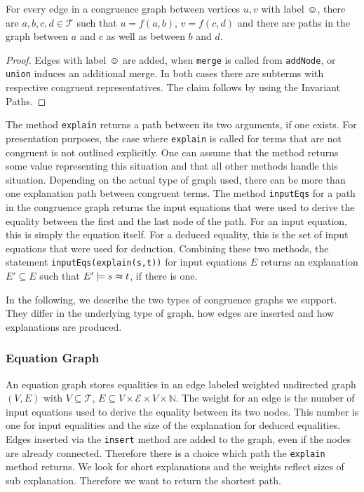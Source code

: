 \begin{invariant}

For every edge in a congruence graph between vertices $u,v$ with label $\smiley$, 
there are $a,b,c,d \in \mathcal{T}$ such that $u = f(a,b)$, $v = f(c,d)$ and
there are paths in the graph between $a$ and $c$ as well as between $b$ and $d$.

\end{invariant}

\begin{proof}

Edges with label $\smiley$ are added, when \texttt{merge} is called from \texttt{addNode}, or \texttt{union} induces an additional merge.
In both cases there are subterms with respective congruent representatives.
The claim follows by using the Invariant Paths.

\end{proof}

The method \texttt{explain} returns a path between its two arguments, if one exists.
For presentation purposes, the case where \texttt{explain} is called for terms that are not congruent is not outlined explicitly.
One can assume that the method returns some value representing this situation and that all other methods handle this situation.
Depending on the actual type of graph used, there can be more than one explanation path between congruent terms.
The method \texttt{inputEqs} for a path in the congruence graph returns the input equations that were used to derive the equality between the first and the last node of the path.
For an input equation, this is simply the equation itself.
For a deduced equality, this is the set of input equations that were used for deduction.
Combining these two methods, the statement \texttt{inputEqs(explain(s,t))} for input equations $E$ returns an explanation $E' \subseteq E$ such that $E' \models s \thickapprox t$, if there is one.



In the following, we describe the two types of congruence graphs we support.
They differ in the underlying type of graph, how edges are inserted and how explanations are produced.

\subsubsection*{Equation Graph}

An equation graph stores equalities in an edge labeled weighted undirected graph $(V,E)$ with 
$V \subseteq \mathcal{T}$, $E \subseteq V \times \mathcal{E} \times V \times \mathbb{N}$.
The weight for an edge is the number of input equations used to derive the equality between its two nodes.
This number is one for input equalities and the size of the explanation for deduced equalities.
Edges inserted via the \texttt{insert} method are added to the graph, even if the nodes are already connected.
Therefore there is a choice which path the \texttt{explain} method returns.
We look for short explanations and the weights reflect sizes of sub explanation.
Therefore we want to return the shortest path.

